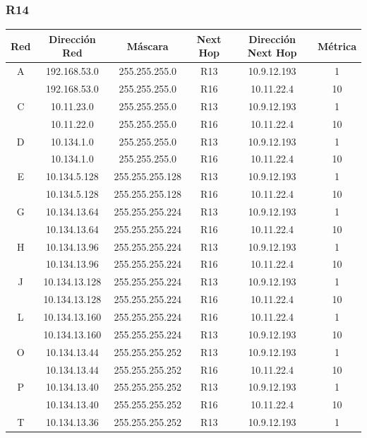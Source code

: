 \documentclass[12pt, a4paper, spanish]{article}
\begin{document}
\subsubsection{R14}
\begin{center}
\begin{tabular}{|c|c|c|c|c|c|}
	\hline
	Red & Dirección Red & Máscara & Next Hop & Dirección Next Hop & Métrica \\
	\hline
	\hline
	A & 192.168.53.0 & 255.255.255.0 & R13 & 10.9.12.193 & 1\\
	 & 192.168.53.0 & 255.255.255.0 & R16 & 10.11.22.4 & 10\\
	\hline
	C & 10.11.23.0 & 255.255.255.0 & R13 & 10.9.12.193 & 1\\
	 & 10.11.22.0 & 255.255.255.0 & R16 & 10.11.22.4 & 10\\
	\hline
	D & 10.134.1.0 & 255.255.255.0 & R13 & 10.9.12.193 & 1\\
	 & 10.134.1.0 & 255.255.255.0 & R16 & 10.11.22.4 & 10\\
	\hline
	E & 10.134.5.128 & 255.255.255.128 & R13 & 10.9.12.193 & 1\\
	 & 10.134.5.128 & 255.255.255.128 & R16 & 10.11.22.4 & 10\\
	\hline
	G & 10.134.13.64 & 255.255.255.224 & R13 & 10.9.12.193 & 1\\
	 & 10.134.13.64 & 255.255.255.224 & R16 & 10.11.22.4 & 10\\
	\hline
	H & 10.134.13.96 & 255.255.255.224 & R13 & 10.9.12.193 & 1\\
	 & 10.134.13.96 & 255.255.255.224 & R16 & 10.11.22.4 & 10\\
	\hline
	J & 10.134.13.128 & 255.255.255.224 & R13 & 10.9.12.193 & 1\\
	 & 10.134.13.128 & 255.255.255.224 & R16 & 10.11.22.4 & 10\\
	\hline
	L & 10.134.13.160 & 255.255.255.224 & R16 & 10.11.22.4 & 1\\
	 & 10.134.13.160 & 255.255.255.224 & R13 & 10.9.12.193 & 10\\
	\hline
	O & 10.134.13.44 & 255.255.255.252 & R13 & 10.9.12.193 & 1\\
	 & 10.134.13.44 & 255.255.255.252 & R16 & 10.11.22.4 & 10\\
	\hline
	P & 10.134.13.40 & 255.255.255.252 & R13 & 10.9.12.193 & 1\\
	 & 10.134.13.40 & 255.255.255.252 & R16 & 10.11.22.4 & 10\\
	\hline
	T & 10.134.13.36 & 255.255.255.252 & R13 & 10.9.12.193 & 1\\

\end{tabular}
\end{center}
\end{document}
